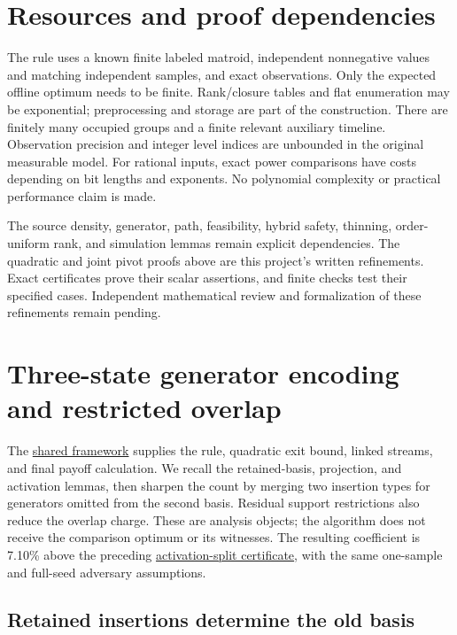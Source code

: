 \documentclass[11pt]{article}
\begin{document}
\section{Resources and proof dependencies}\label{resources-and-proof-dependencies}

The rule uses a known finite labeled matroid, independent nonnegative values and matching independent samples, and exact observations. Only the expected offline optimum needs to be finite. Rank/closure tables and flat enumeration may be exponential; preprocessing and storage are part of the construction. There are finitely many occupied groups and a finite relevant auxiliary timeline. Observation precision and integer level indices are unbounded in the original measurable model. For rational inputs, exact power comparisons have costs depending on bit lengths and exponents. No polynomial complexity or practical performance claim is made.

The source density, generator, path, feasibility, hybrid safety, thinning, order-uniform rank, and simulation lemmas remain explicit dependencies. The quadratic and joint pivot proofs above are this project's written refinements. Exact certificates prove their scalar assertions, and finite checks test their specified cases. Independent mathematical review and formalization of these refinements remain pending.

\section{Three-state generator encoding and restricted overlap}\label{three-state-generator-encoding-and-restricted-overlap}

The \href{https://github.com/shea256/matroid-prophet-inequality/blob/master/paper/framework.md}{shared framework} supplies the rule, quadratic exit bound, linked streams, and final payoff calculation. We recall the retained-basis, projection, and activation lemmas, then sharpen the count by merging two insertion types for generators omitted from the second basis. Residual support restrictions also reduce the overlap charge. These are analysis objects; the algorithm does not receive the comparison optimum or its witnesses. The resulting coefficient is 7.10\% above the preceding \href{https://github.com/shea256/matroid-prophet-inequality/blob/master/results/activation-split.md}{activation-split certificate}, with the same one-sample and full-seed adversary assumptions.

\subsection{Retained insertions determine the old basis}\label{retained-insertions-determine-the-old-basis}
\end{document}
